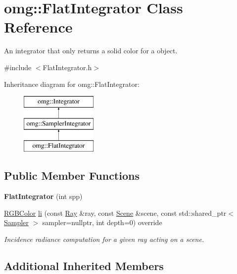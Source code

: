 \hypertarget{classomg_1_1_flat_integrator}{}\section{omg\+::Flat\+Integrator Class Reference}
\label{classomg_1_1_flat_integrator}


An integrator that only returns a solid color for a object.  




{\ttfamily \#include $<$Flat\+Integrator.\+h$>$}

Inheritance diagram for omg\+::Flat\+Integrator\+:\begin{figure}[H]
\begin{center}
\leavevmode
\includegraphics[height=3.000000cm]{classomg_1_1_flat_integrator}
\end{center}
\end{figure}
\subsection*{Public Member Functions}
\begin{DoxyCompactItemize}
\item 
\mbox{\label{classomg_1_1_flat_integrator_a64befd40b85709d5d7c02cf750506029}} 
{\bfseries Flat\+Integrator} (int spp)
\item 
\mbox{\hyperlink{namespaceomg_a7b0e3f3dcf76f2b4758c314a41885917}{R\+G\+B\+Color}} \mbox{\hyperlink{classomg_1_1_flat_integrator_abda6cdbca64bc6a82ebc4460ab71a276}{li}} (const \mbox{\hyperlink{classomg_1_1_ray}{Ray}} \&ray, const \mbox{\hyperlink{classomg_1_1_scene}{Scene}} \&scene, const std\+::shared\+\_\+ptr$<$ \mbox{\hyperlink{classomg_1_1_sampler}{Sampler}} $>$ sampler=nullptr, int depth=0) override
\begin{DoxyCompactList}\small\item\em Incidence radiance computation for a given ray acting on a scene. \end{DoxyCompactList}\end{DoxyCompactItemize}
\subsection*{Additional Inherited Members}


